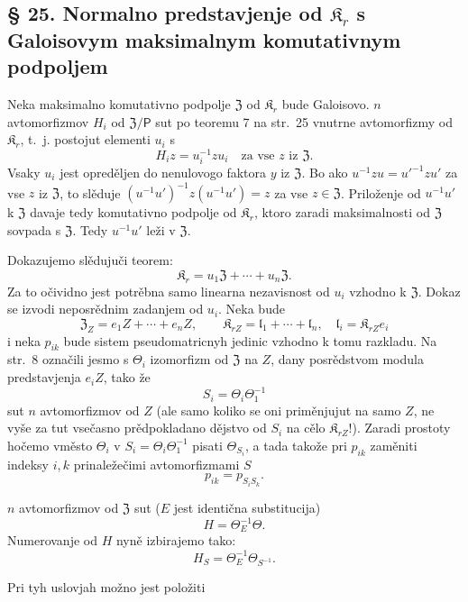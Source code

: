 \documentclass[11pt]{article}
\begin{document}
\subsection*{§ 25. Normalno predstavjenje od \(\mathfrak K_r\) s Galoisovym maksimalnym komutativnym podpoljem\protect\footnotemark}
\label{normaldarstellung-von-r_r-mit-galoisschem-maximalem-kommutativem-teilkoerper-1}

Neka maksimalno komutativno podpolje \(\mathfrak Z\) od \(\mathfrak K_r\) bude Galoisovo. \(n\) avtomorfizmov \(H_i\) od \(\mathfrak Z/\mathsf P\) sut po teoremu 7 na str.~25 vnutrne avtomorfizmy od \(\mathfrak K_r\), t.~j. postojut elementi \(u_i\) s
\[
H_i z=u_i^{-1}zu_i\quad\text{za vse }z\text{ iz }\mathfrak Z.
\]
Vsaky \(u_i\) jest opreděljen do nenulovogo faktora \(y\) iz \(\mathfrak Z\). Bo ako \(u^{-1}zu=u'^{-1}zu'\) za vse \(z\) iz \(\mathfrak Z\), to slěduje \((u^{-1}u')^{-1}z(u^{-1}u')=z\) za vse \(z\in\mathfrak Z\). Priloženje od \(u^{-1}u'\) k \(\mathfrak Z\) davaje tedy komutativno podpolje od \(\mathfrak K_r\), ktoro zaradi maksimalnosti od \(\mathfrak Z\) sovpada s \(\mathfrak Z\). Tedy \(u^{-1}u'\) leži v \(\mathfrak Z\).

Dokazujemo slědujuči teorem:
\[
\mathfrak K_r=u_1\mathfrak Z+\cdots+u_n\mathfrak Z.
\]
Za to očividno jest potrěbna samo linearna nezavisnost od \(u_i\) vzhodno k \(\mathfrak Z\). Dokaz se izvodi neposrědnim zadanjem od \(u_i\). Neka bude
\[
\mathfrak Z_Z=e_1Z+\cdots+e_nZ,\qquad
\mathfrak K_{rZ}=\mathfrak l_1+\cdots+\mathfrak l_n,\quad
\mathfrak l_i=\mathfrak K_{rZ}e_i
\]
i neka \(p_{ik}\) bude sistem pseudomatricnyh jedinic vzhodno k tomu razkladu. Na str.~8 označili jesmo s \(\Theta_i\) izomorfizm od \(\mathfrak Z\) na \(Z\), dany posrědstvom modula predstavjenja \(e_iZ\), tako že
\[
S_i=\Theta_i\Theta_1^{-1}
\]
sut \(n\) avtomorfizmov od \(Z\) (ale samo koliko se oni priměnjujut na samo \(Z\), ne vyše za tut vsečasno prědpokladano dějstvo od \(S_i\) na cělo \(\mathfrak K_{rZ}\)!). Zaradi prostoty hočemo vměsto \(\Theta_i\) v \(S_i=\Theta_i\Theta_1^{-1}\) pisati \(\Theta_{S_i}\), a tada takože pri \(p_{ik}\) zaměniti indeksy \(i,k\) prinaležečimi avtomorfizmami \(S\)
\[
p_{ik}=p_{S_iS_k}.
\]

\(n\) avtomorfizmov od \(\mathfrak Z\) sut (\(E\) jest identična substitucija)
\[
H=\Theta_E^{-1}\Theta.
\]
Numerovanje od \(H\) nyně izbirajemo tako:
\[
H_S=\Theta_E^{-1}\Theta_{S^{-1}}.
\]

Pri tyh uslovjah možno jest položiti
\end{document}
